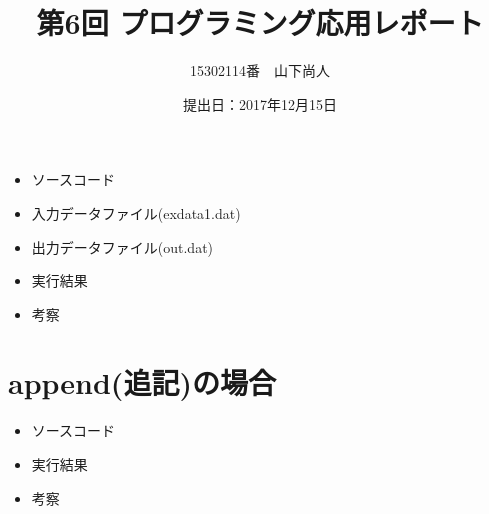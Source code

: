 \documentclass[a4paper]{jsarticle}
\title{第6回 プログラミング応用レポート}
\author{15302114番　山下尚人}
\date{提出日：2017年12月15日}
\begin{document}
\maketitle%

\section{}
	\begin{itemize}
	\item ソースコード
		 
		\mbox{}\newline
	\item 入力データファイル(exdata1.dat)
		 
		\mbox{}\newline
	\item 出力データファイル(out.dat)
		 
		\mbox{}\newline
	\item 実行結果
		 
		\mbox{}\newline
	\item 考察\mbox{}\\
			
	\end{itemize}
	\newpage	%

\section{append(追記)の場合}
	\begin{itemize}
	\item ソースコード
		 
		\mbox{}\newline
	\item 実行結果
		 
		\mbox{}\newline
	\item 考察\mbox{}\\
	\end{itemize}
	\newpage	%
	
\end{document}
